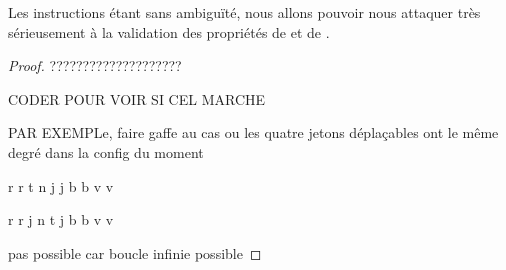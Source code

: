 \bigskip

Les instructions étant sans ambiguïté, nous allons pouvoir nous attaquer très sérieusement à la validation des propriétés de  et de .

\begin{proof}
	????????????????????
	
	CODER POUR VOIR SI CEL MARCHE 
	
	PAR EXEMPLe, faire gaffe au cas ou les quatre jetons déplaçables ont le même degré dans la config du moment
	
	r r t n j j b b v v
	
	r r j n t j b b v v
	
	pas possible car boucle infinie possible
\end{proof}
